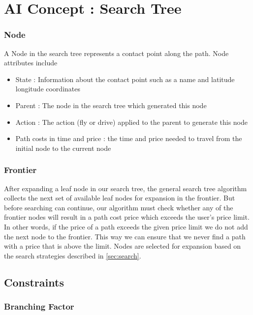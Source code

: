 \documentclass[11pt]{article}
\begin{document}
\section{AI Concept : Search Tree}

\subsubsection{Node} A Node in the search tree represents a contact point along the path. Node attributes include
\begin{itemize}
\item State : Information about the contact point such as a name and latitude longitude coordinates
\item Parent : The node in the search tree which generated this node
\item Action : The action (fly or drive) applied to the parent to generate this node
\item Path costs in time and price : the time and price needed to travel from the initial node to the current node
\end{itemize}

\subsubsection{Frontier}

After expanding a leaf node in our search tree, the general search tree algorithm collects the next set of available leaf nodes for expansion in the frontier. But before searching can continue, our algorithm must check whether any of the frontier nodes will result in a path cost price which exceeds the user's price limit. In other words, if the price of a path exceeds the given price limit we do not add the next node to the frontier. This way we can ensure that we never find a path with a price that is above the limit. Nodes are selected for expansion based on the search strategies described in \ref{sec:search}.

\subsection{Constraints}

\subsubsection{Branching Factor}
\end{document}
